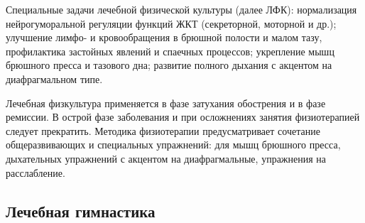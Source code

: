 \documentclass[a4paper]{article}
\begin{document}
    Специальные задачи лечебной физической культуры (далее ЛФК): нормализация нейрогуморальной регуляции функций ЖКТ (секреторной, моторной и др.); улучшение лимфо- и кровообращения в брюшной полости и малом тазу, профилактика застойных явлений и спаечных процессов; укрепление мышц брюшного пресса и тазового дна; развитие полного дыхания с акцентом на диафрагмальном типе.

    Лечебная физкультура применяется в фазе затухания обострения и в фазе ремиссии. В острой фазе заболевания и при осложнениях занятия физиотерапией следует прекратить. Методика физиотерапии предусматривает сочетание общеразвивающих и специальных упражнений: для мышц брюшного пресса, дыхательных упражнений с акцентом на диафрагмальные, упражнения на расслабление.

    \subsection{Лечебная гимнастика}
    
\end{document}
